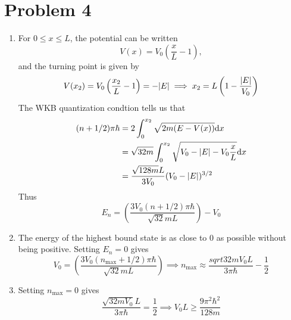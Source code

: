 \documentclass[12pt]{article}
\begin{document}
\section*{Problem 4}
\begin{enumerate}[label=(\alph*)]
    \item For $0 \leq x \leq L$, the potential can be written
    \[ V(x) = V_0\left(\frac{x}{L} - 1\right), \]
    and the turning point is given by
    \[ V(x_2) = V_0\left(\frac{x_2}{L} - 1\right) = -\abs{E} \implies x_2 = L\left(1 - \frac{\abs{E}}{V_0}\right) \]
    The WKB quantization condtion tells us that
    \begin{align*}
        (n+1/2)\pi\hbar &= 2\int_0^{x_2}\sqrt{2m(E-V(x))} \dd x \\
        &= \sqrt{32m}\int_0^{x_2}\sqrt{V_0 - \abs{E} - V_0\frac{x}{L}} \dd x \\
        &= \frac{\sqrt{128m}L}{3V_0}(V_0 - \abs{E})^{3/2}
    \end{align*}
    Thus
    \[ E_n = \left(\frac{3V_0(n + 1/2)\pi\hbar}{\sqrt{32}mL}\right) - V_0 \]

    \item The energy of the highest bound state is as close to 0 as possible without being positive. Setting $E_n = 0$ gives
    \[ V_0 = \left(\frac{3V_0(n_\text{max}+1/2)\pi\hbar}{\sqrt{32}mL}\right) \implies n_\text{max} \approx \frac{sqrt{32mV_0}L}{3\pi\hbar} - \frac{1}{2} \]

    \item Setting $n_\text{max} = 0$ gives
    \[ \frac{\sqrt{32mV_0}L}{3\pi\hbar} = \frac{1}{2} \implies V_0L \geq \frac{9\pi^2\hbar^2}{128m} \]
\end{enumerate}
\end{document}
